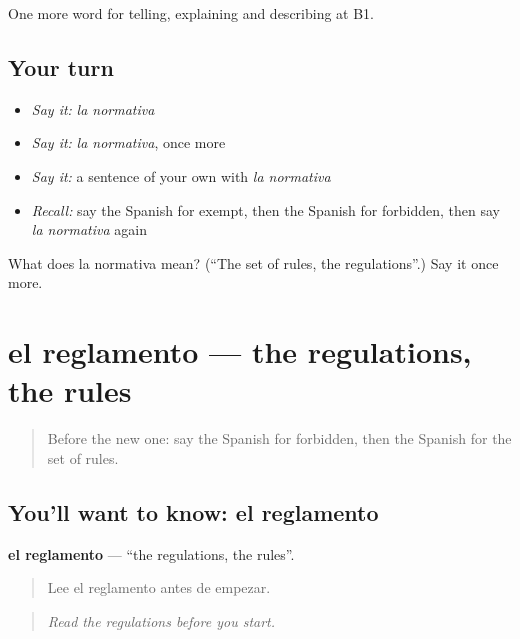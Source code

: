 \begin{grammarlens}[title={What you've built}]
One more word for telling, explaining and describing at B1.
\end{grammarlens}

\subsection*{Your turn}
\begin{itemize}
\raggedright
  \item \emph{Say it:} \emph{la normativa}
  \item \emph{Say it:} \emph{la normativa}, once more
  \item \emph{Say it:} a sentence of your own with \emph{la normativa}
  \item \emph{Recall:} say the Spanish for exempt, then the Spanish for forbidden, then say \emph{la normativa} again
\end{itemize}

\begin{tcolorbox}[breakable,colback=teal!4,colframe=teal!35!black,title={Before you move on}]
What does la normativa mean? (\textquotedblleft{}The set of rules, the regulations\textquotedblright{}.) Say it once more.
\end{tcolorbox}
\section[el reglamento]{el reglamento — the regulations, the rules}

\label{lesson:ES-C622-reglamento}



\begin{quote}
Before the new one: say the Spanish for forbidden, then the Spanish for the set of rules.
\end{quote}

\subsection*{You'll want to know: el reglamento}
\textbf{el reglamento} — \textquotedblleft{}the regulations, the rules\textquotedblright{}.

\begin{quote}
Lee el reglamento antes de empezar.
\end{quote}

\begin{quote}
\emph{Read the regulations before you start.}
\end{quote}

